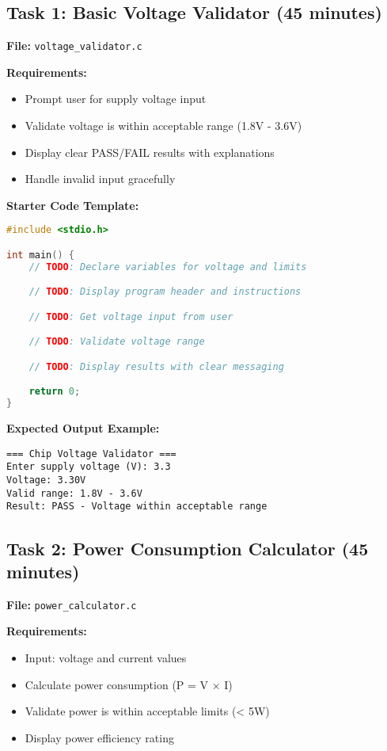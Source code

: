 \documentclass[11pt,a4paper]{article}
\begin{document}
\subsection{Task 1: Basic Voltage Validator (45 minutes)}

\textbf{File:} \texttt{voltage\_validator.c}

\textbf{Requirements:}
\begin{itemize}
    \item Prompt user for supply voltage input
    \item Validate voltage is within acceptable range (1.8V - 3.6V)
    \item Display clear PASS/FAIL results with explanations
    \item Handle invalid input gracefully
\end{itemize}

\textbf{Starter Code Template:}
\begin{lstlisting}[language=C]
#include <stdio.h>

int main() {
    // TODO: Declare variables for voltage and limits

    // TODO: Display program header and instructions

    // TODO: Get voltage input from user

    // TODO: Validate voltage range

    // TODO: Display results with clear messaging

    return 0;
}
\end{lstlisting}

\textbf{Expected Output Example:}
\begin{verbatim}
=== Chip Voltage Validator ===
Enter supply voltage (V): 3.3
Voltage: 3.30V
Valid range: 1.8V - 3.6V
Result: PASS - Voltage within acceptable range
\end{verbatim}

\subsection{Task 2: Power Consumption Calculator (45 minutes)}

\textbf{File:} \texttt{power\_calculator.c}

\textbf{Requirements:}
\begin{itemize}
    \item Input: voltage and current values
    \item Calculate power consumption (P = V × I)
    \item Validate power is within acceptable limits (< 5W)
    \item Display power efficiency rating
\end{itemize}
\end{document}
